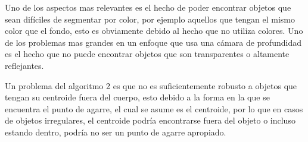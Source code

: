     Uno de los aspectos mas relevantes es el hecho de poder encontrar objetos que sean difíciles de segmentar por color, por ejemplo aquellos que tengan el mismo color que el fondo, esto es obviamente debido al hecho que no utiliza colores.
    Uno de los problemas mas grandes en un enfoque que usa una cámara de profundidad es el hecho que no puede encontrar objetos que son transparentes o altamente reflejantes.
    
    
    Un problema del algoritmo 2 es que no es suficientemente robusto a objetos que tengan su centroide  fuera del cuerpo, esto debido a la forma en la que se encuentra el punto de agarre, el cual se asume es el centroide, por lo que en casos de objetos irregulares, el centroide podría encontrarse fuera del objeto o incluso estando dentro, podría no ser un punto de agarre apropiado.
    
    

    
